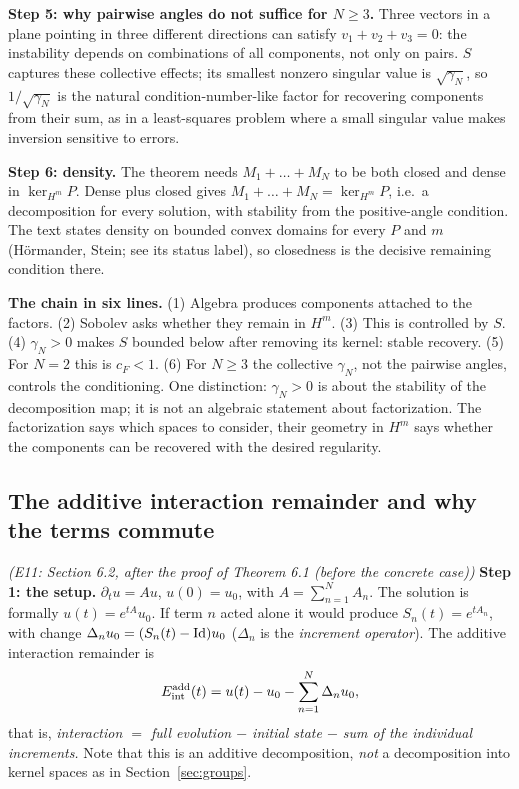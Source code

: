 \medskip\textbf{Step 5: why pairwise angles do not suffice for $N\ge3$.} Three vectors in a plane pointing in three different directions can satisfy $v_1+v_2+v_3=0$: the instability depends on combinations of all components, not only on pairs. $S$ captures these collective effects; its smallest nonzero singular value is $\sqrt{\gamma_N}$, so $1/\sqrt{\gamma_N}$ is the natural condition-number-like factor for recovering components from their sum, as in a least-squares problem where a small singular value makes inversion sensitive to errors.

\medskip\textbf{Step 6: density.} The theorem needs $M_1+\dots+M_N$ to be both closed and dense in $\ker_{H^m}P$. Dense plus closed gives $M_1+\dots+M_N=\ker_{H^m}P$, i.e.\ a decomposition for every solution, with stability from the positive-angle condition. The text states density on bounded convex domains for every $P$ and $m$ (H\"ormander, Stein; see its status label), so closedness is the decisive remaining condition there.

\medskip\textbf{The chain in six lines.} (1) Algebra produces components attached to the factors. (2) Sobolev asks whether they remain in $H^m$. (3) This is controlled by $S$. (4) $\gamma_N>0$ makes $S$ bounded below after removing its kernel: stable recovery. (5) For $N=2$ this is $c_F<1$. (6) For $N\ge3$ the collective $\gamma_N$, not the pairwise angles, controls the conditioning. One distinction: $\gamma_N>0$ is about the stability of the decomposition map; it is not an algebraic statement about factorization. The factorization says which spaces to consider, their geometry in $H^m$ says whether the components can be recovered with the desired regularity.

\subsection{The additive interaction remainder and why the terms commute}\label{expl:E11}
\noindent\emph{(E11: Section 6.2, after the proof of Theorem 6.1 (before the concrete case))}
\textbf{Step 1: the setup.} $\partial_tu=Au$, $u(0)=u_0$, with $A=\sum_{n=1}^NA_n$. The solution is formally $u(t)=e^{tA}u_0$. If term $n$ acted alone it would produce $S_n(t)=e^{tA_n}$, with change $\Delta_nu_0=(S_n(t)-\mathrm{Id})u_0$ ($\Delta_n$ is the \emph{increment operator}). The additive interaction remainder is
\[
E_{\mathrm{int}}^{\mathrm{add}}(t)=u(t)-u_0-\sum_{n=1}^N\Delta_nu_0,
\]
that is, \emph{interaction $=$ full evolution $-$ initial state $-$ sum of the individual increments.}
Note that this is an additive decomposition, \emph{not} a decomposition into kernel spaces as in Section~\ref{sec:groups}.

